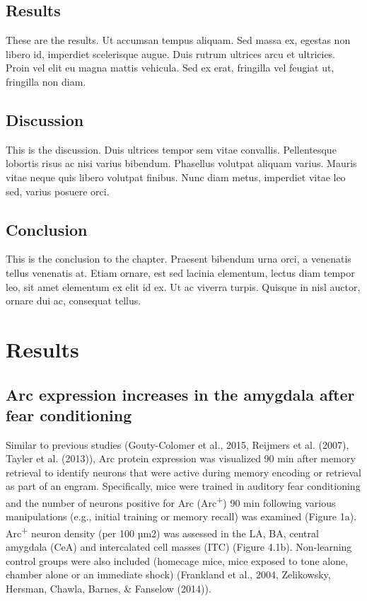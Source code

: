 \documentclass[12pt,a4paperpaper,]{report}
\begin{document}
\section{Results}\label{results}

These are the results. Ut accumsan tempus aliquam. Sed massa ex, egestas
non libero id, imperdiet scelerisque augue. Duis rutrum ultrices arcu et
ultricies. Proin vel elit eu magna mattis vehicula. Sed ex erat,
fringilla vel feugiat ut, fringilla non diam.

\section{Discussion}\label{discussion}

This is the discussion. Duis ultrices tempor sem vitae convallis.
Pellentesque lobortis risus ac nisi varius bibendum. Phasellus volutpat
aliquam varius. Mauris vitae neque quis libero volutpat finibus. Nunc
diam metus, imperdiet vitae leo sed, varius posuere orci.

\section{Conclusion}\label{conclusion-1}

This is the conclusion to the chapter. Praesent bibendum urna orci, a
venenatis tellus venenatis at. Etiam ornare, est sed lacinia elementum,
lectus diam tempor leo, sit amet elementum ex elit id ex. Ut ac viverra
turpis. Quisque in nisl auctor, ornare dui ac, consequat tellus.

\chapter{Results}\label{results-1}

\section{Arc expression increases in the amygdala after fear
conditioning}\label{arc-expression-increases-in-the-amygdala-after-fear-conditioning}

Similar to previous studies (Gouty-Colomer et al., 2015, Reijmers et al.
(2007), Tayler et al. (2013)), Arc protein expression was visualized 90
min after memory retrieval to identify neurons that were active during
memory encoding or retrieval as part of an engram. Specifically, mice
were trained in auditory fear conditioning and the number of neurons
positive for Arc (Arc\textsuperscript{+}) 90 min following various
manipulations (e.g., initial training or memory recall) was examined
(Figure 1a). Arc\textsuperscript{+} neuron density (per 100 µm2) was
assessed in the LA, BA, central amygdala (CeA) and intercalated cell
masses (ITC) (Figure 4.1b). Non-learning control groups were also
included (homecage mice, mice exposed to tone alone, chamber alone or an
immediate shock) (Frankland et al., 2004, Zelikowsky, Hersman, Chawla,
Barnes, \& Fanselow (2014)).
\end{document}
